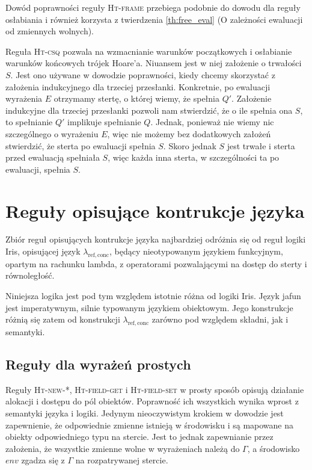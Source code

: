 \documentclass[]{pracamgr}
\renewcommand \| {\hspace{0.75em} | \hspace{0.75em} }
\renewcommand \[ {[\![}
\renewcommand \] {]\!]}
\theoremstyle{definition}
\begin{document}
Dowód poprawności reguły \textsc{Ht-frame} przebiega podobnie do dowodu dla reguły osłabiania i
również korzysta z twierdzenia \ref{th:free_eval} (O zależności ewaluacji od zmiennych wolnych).

Reguła \textsc{Ht-csq} pozwala na wzmacnianie warunków początkowych i osłabianie warunków końcowych
trójek Hoare'a.
Niuansem jest w niej założenie o trwałości $S$.
Jest ono używane w dowodzie poprawności, kiedy chcemy skorzystać z założenia indukcyjnego dla
trzeciej przesłanki. Konkretnie, po ewaluacji wyrażenia $E$ otrzymamy stertę, o której
wiemy, że spełnia $Q'$. Założenie indukcyjne dla trzeciej przesłanki pozwoli nam stwierdzić,
że o ile spełnia ona $S$, to spełnianie $Q'$ implikuje spełnianie $Q$.
Jednak, ponieważ nie wiemy nic szczególnego o wyrażeniu $E$, więc nie możemy bez dodatkowych
założeń stwierdzić, że sterta po ewaluacji spełnia $S$.
Skoro jednak $S$ jest trwałe i sterta przed ewaluacją spełniała $S$, więc każda inna sterta,
w szczególności ta po ewaluacji, spełnia $S$.

\section{Reguły opisujące kontrukcje języka}
Zbiór reguł opisujących kontrukcje języka najbardziej odróżnia się od reguł logiki Iris,
opisującej język $\lambda_{\mathrm{ref, conc}}$, będący nieotypowanym językiem funkcyjnym, opartym
na rachunku lambda, z operatorami pozwalającymi na dostęp do sterty i równoległość.

Niniejsza logika jest pod tym względem istotnie różna od logiki Iris. 
Język jafun jest imperatywnym, silnie typowanym językiem obiektowym.
Jego konstrukcje różnią się zatem od konstrukcji $\lambda_{\mathrm{ref, conc}}$ zarówno pod względem
składni, jak i semantyki.

\subsection{Reguły dla wyrażeń prostych}
Reguły \textsc{Ht-new-*}, \textsc{Ht-field-get} i \textsc{Ht-field-set} w prosty sposób opisują
działanie alokacji i dostępu do pól obiektów. Poprawność ich wszystkich
wynika wprost z semantyki języka i logiki.
Jedynym nieoczywistym krokiem w dowodzie jest zapewnienie, że odpowiednie zmienne istnieją w
środowisku i są mapowane na obiekty odpowiedniego typu na stercie. 
Jest to jednak zapewnianie przez założenia, że wszystkie zmienne wolne w wyrażeniach należą do $\Gamma$,
a środowisko $env$ zgadza się z $\Gamma$ na rozpatrywanej stercie.
\end{document}
